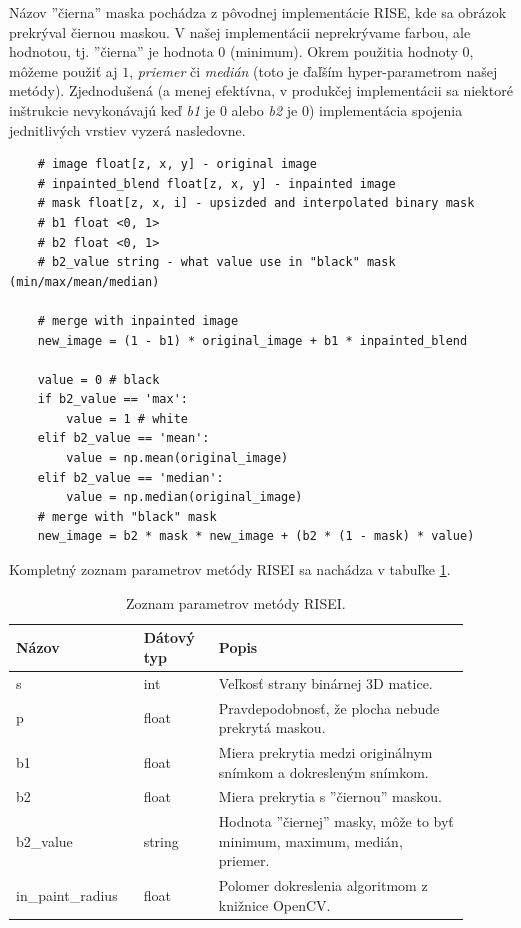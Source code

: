 Názov ''čierna'' maska pochádza z pôvodnej implementácie RISE, kde sa obrázok prekrýval čiernou maskou. V našej implementácii neprekrývame farbou, ale hodnotou, tj. ''čierna'' je hodnota $0$ (minimum). Okrem použitia hodnoty $0$, môžeme použiť aj $1$, \textit{priemer} či \textit{medián} (toto je ďaľším hyper-parametrom našej metódy). Zjednodušená (a menej efektívna, v produkčej implementácii sa niektoré inštrukcie nevykonávajú keď \textit{b1} je 0 alebo \textit{b2} je 0) implementácia spojenia jednitlivých vrstiev vyzerá nasledovne.

\begin{lstlisting}
    # image float[z, x, y] - original image
    # inpainted_blend float[z, x, y] - inpainted image
    # mask float[z, x, i] - upsizded and interpolated binary mask
    # b1 float <0, 1>
    # b2 float <0, 1>
    # b2_value string - what value use in "black" mask (min/max/mean/median)

    # merge with inpainted image
    new_image = (1 - b1) * original_image + b1 * inpainted_blend

    value = 0 # black
    if b2_value == 'max':
        value = 1 # white
    elif b2_value == 'mean':
        value = np.mean(original_image)
    elif b2_value == 'median':
        value = np.median(original_image)
    # merge with "black" mask
    new_image = b2 * mask * new_image + (b2 * (1 - mask) * value)
\end{lstlisting}

Kompletný zoznam parametrov metódy RISEI sa nachádza v tabuľke \ref{tab:rise_params}.

\begin{table}[]
    \begin{tabular}{p{0.25\linewidth} | p{0.15\linewidth} | p{0.5\linewidth}}
        \hline
        Názov             & Dátový typ & Popis                                                               \\ \hline
        s                 & int        & Veľkosť strany binárnej 3D matice.                                        \\
        p                 & float      & Pravdepodobnosť, že plocha nebude prekrytá maskou.                        \\
        b1                & float      & Miera prekrytia medzi originálnym snímkom a dokresleným snímkom.          \\
        b2                & float      & Miera prekrytia s ''čiernou'' maskou.                                     \\
        b2\_value         & string     & Hodnota ''čiernej'' masky, môže to byť minimum, maximum, medián, priemer. \\
        in\_paint\_radius & float      & Polomer dokreslenia algoritmom z knižnice OpenCV.                         \\ \hline
    \end{tabular}
    \caption{Zoznam parametrov metódy RISEI.}
    \label{tab:rise_params}
\end{table}


